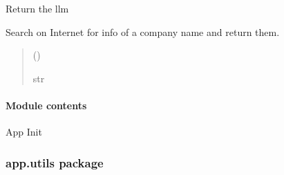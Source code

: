 \documentclass[letterpaper,10pt,english]{sphinxmanual}
\begin{document}
\begin{fulllineitems}
\label{\detokenize{app.services:app.services.langchain.prepare_llm}}
\pysigstartsignatures
{}
\pysigstopsignatures
\sphinxAtStartPar
Return the llm

\end{fulllineitems}


\begin{fulllineitems}
\label{\detokenize{app.services:app.services.langchain.search_info_of_company}}
\pysigstartsignatures
{}
\pysigstopsignatures
\sphinxAtStartPar
Search on Internet for info of a company name and return them.
\begin{quote}\begin{description}
\sphinxAtStartPar
{} () \textendash{} 

\sphinxAtStartPar
str

\end{description}\end{quote}

\end{fulllineitems}



\paragraph{Module contents}
\label{\detokenize{app.services:module-app.services}}\label{\detokenize{app.services:module-contents}}
\sphinxAtStartPar
App Init

\sphinxstepscope


\subsubsection{app.utils package}
\label{\detokenize{app.utils:app-utils-package}}\label{\detokenize{app.utils::doc}}
\end{document}
